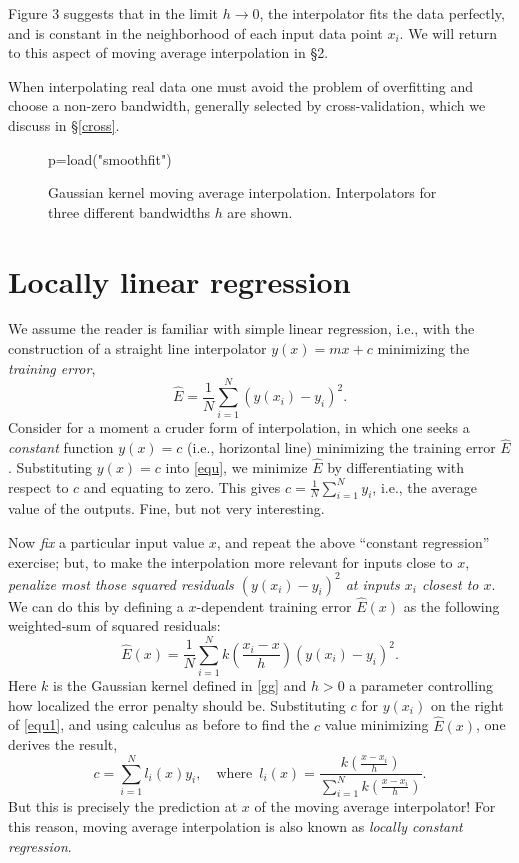 \documentclass[11pt, reqno]{amsart}
\newcommand\df{\em}
\begin{document}
Figure 3 suggests that in the limit $h \rightarrow 0$, the
interpolator fits the data perfectly, and is constant in the
neighborhood of each input data point $x_i$. We will return to this
aspect of moving average interpolation in \S2. 

When interpolating real data one must avoid the problem of overfitting and choose
a non-zero bandwidth, generally selected by cross-validation, which we
discuss in \S\ref{cross}.

\begin{figure}\label{figgg3}
  \begin{sagesilent}
     p=load("smoothfit")
  \end{sagesilent}
  \centering 
  \caption{{} Gaussian kernel moving average interpolation. Interpolators
    for three different bandwidths $h$ are shown.}
\end{figure}

\section{Locally linear regression}\label{linear}
We assume the reader is familiar with simple linear regression, i.e.,
with the construction of a straight line interpolator $y(x)= mx + c$
minimizing the {\df training error},
\begin{equation}
  \hat E = \frac{1}{N}\sum_{i=1}^N (y(x_i) - y_i)^2.\label{equ}
\end{equation}
Consider for a moment a cruder form of interpolation, in which one
seeks a {\em constant} function $y(x)=c$ (i.e., horizontal line)
minimizing the training error $\hat E$. Substituting $y(x) = c$ into
\eqref{equ}, we minimize $\hat E$ by differentiating with respect to
$c$ and equating to zero. This gives $c = \frac{1}{N}\sum_{i=1}^N
y_i$, i.e., the average value of the outputs. Fine, but not very
interesting.

Now {\em fix} a particular input value $x$, and repeat the above
``constant regression'' exercise; but, to make the interpolation more
relevant for inputs close to $x$, {\em penalize most those squared residuals
  $(y(x_i) - y_i)^2$ at inputs $x_i$ closest to $x$}. We can do this
by defining a $x$-dependent training error $\hat E(x)$ as the
following weighted-sum of squared residuals:
\begin{equation}
   \hat E(x) = \frac{1}{N}\sum_{i=1}^N k\left(\frac{x_i - x}{h}\right)(y(x_i) - y_i)^2.\label{equ1}
\end{equation}
Here $k$ is the Gaussian kernel defined in \eqref{gg} and $h>0$ a
parameter controlling how localized the error penalty should
be. Substituting $c$ for $y(x_i)$ on the right of \eqref{equ1}, and
using calculus as before to find the $c$ value minimizing $\hat E(x)$,
one derives the result,
\begin{equation*}
  c=\sum_{i=1}^N l_i(x)y_i,\quad
  \text{where}\enspace l_i(x)=\frac{k(\frac{x-x_i}{h})}{\sum_{i=1}^N k(\frac{x-x_i}{h})}.
\end{equation*}
But this is precisely the prediction at $x$ of the moving average
interpolator! For this reason, moving average interpolation is also
known as {\df locally constant regression}.
\end{document}
